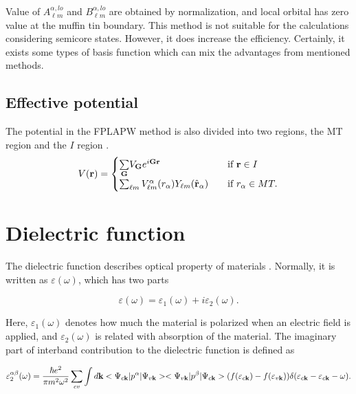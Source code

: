 \documentclass[a4paper, 12pt, titlepage,oneside,drop]{kthesis}
\begin{document}
Value of $A _{{\ell}m}^{\alpha,lo}$ and $B _{{\ell}m}^{\alpha,lo}$ are obtained by normalization, and local orbital has zero value at the muffin tin boundary. This method is not suitable for the calculations considering semicore states.
However, it does increase the efficiency. Certainly, it exists some types of basis function which can mix the advantages from mentioned methods.

\subsection{Effective potential}

\label{epote}
The potential in the FPLAPW method is also divided into two regions, the MT region and the $I$ region \cite{nordstrom2006planewaves}.
\begin{equation*}\label{lap7}
V(\textbf{r}) = 
\begin{cases} \sumg<{\textbf G}> V_{\textbf G} e^{i {\textbf G} {\textbf {r}  }} & \quad \mbox{if $\textbf{r} \in {I} $}
\\
 \sum_{{\ell}m} V_{{\ell}m}^{\alpha} (r_{\alpha}) Y_{{\ell}m}(\hat{{\textbf r}}_{\alpha})  & \quad \mbox{if $r_{\alpha} \in MT. $}\\ 
\end{cases}
\end{equation*}

\section{Dielectric function}
The dielectric function describes optical property of materials \cite{penn1962wave, fox2002optical}. Normally, it is written as $\varepsilon(\omega)$, which has two parts

\begin{equation}
 \varepsilon(\omega) = \varepsilon_1(\omega) + i \varepsilon_2(\omega).
\end{equation}

Here, $\varepsilon_1(\omega)$ denotes how much the material is polarized when an electric field is applied, and $\varepsilon_2(\omega)$ is related with absorption of the material. The imaginary part of interband contribution to the dielectric function is defined as

\begin{equation}\label{df2}
\varepsilon_2^{\alpha\beta} (\omega)= \frac{\hbar e^2}{\pi m^2\omega^2} \sum_{cv} \int d \textbf {k} <\Psi_{c{\textbf k}}|p^\alpha|\Psi_{v{\textbf k}}><\Psi_{v{\textbf k}}|p^\beta|\Psi_{c{\textbf k}}> (f(\varepsilon_{c \textbf k})-f(\varepsilon_{v \textbf k}))\delta(\varepsilon_{c {\textbf k}}-\varepsilon_{c{\textbf k}}-\omega).
\end{equation}
\end{document}
